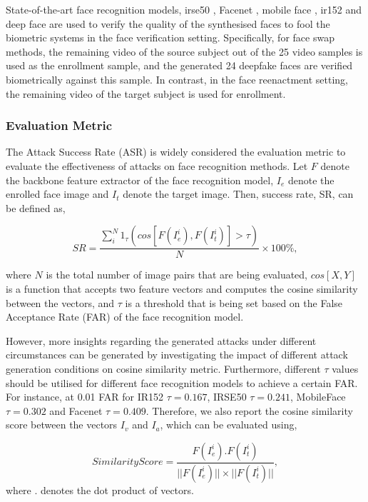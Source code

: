 State-of-the-art face recognition models, irse50 \cite{hu2018squeeze}, Facenet \cite{schroff2015facenet}, mobile face \cite{chen2018mobilefacenets}, ir152 \cite{deng2019arcface} and deep face \cite{serengil2024lightface} are used to verify the quality of the synthesised faces to fool the biometric systems in the face verification setting. Specifically, for face swap methods, the remaining video of the source subject out of the 25 video samples is used as the enrollment sample, and the generated 24 deepfake faces are verified biometrically against this sample. In contrast, in the face reenactment setting, the remaining video of the target subject is used for enrollment. 

\subsubsection{Evaluation Metric}
The Attack Success Rate (ASR) \cite{deb2020advfaces, zhong2020towards} is widely considered the evaluation metric to evaluate the effectiveness of attacks on face recognition methods. Let $F$ denote the backbone feature extractor of the face recognition model, $I_e$ denote the enrolled face image and $I_t$ denote the target image. Then, success rate, SR, can be defined as,

\begin{equation}
    SR = \frac{\sum_{i}^{N}1_{\tau}(cos[F(I^i_e), F(I^i_t)] > \tau)}{N} \times 100\%,
\end{equation}

where $N$ is the total number of image pairs that are being evaluated, $cos[X, Y]$ is a function that accepts two feature vectors and computes the cosine similarity between the vectors, and $\tau$ is a threshold that is being set based on the False Acceptance Rate (FAR) of the face recognition model.

However, more insights regarding the generated attacks under different circumstances can be generated by investigating the impact of different attack generation conditions on cosine similarity metric. Furthermore, different $\tau$ values should be utilised for different face recognition models to achieve a certain FAR. For instance, at 0.01 FAR for IR152 $\tau = 0.167$, IRSE50 $\tau =0.241$, MobileFace $\tau =0.302$ and Facenet $\tau =0.409$. Therefore, we also report the cosine similarity score between the vectors $I_v$ and $I_a$, which can be evaluated using,

\begin{equation}
    Similarity Score = \frac{F(I^i_e) . F(I^i_t)} {||F(I^i_e)|| \times ||F(I^i_t)||},
\end{equation}
where $.$ denotes the dot product of vectors.


